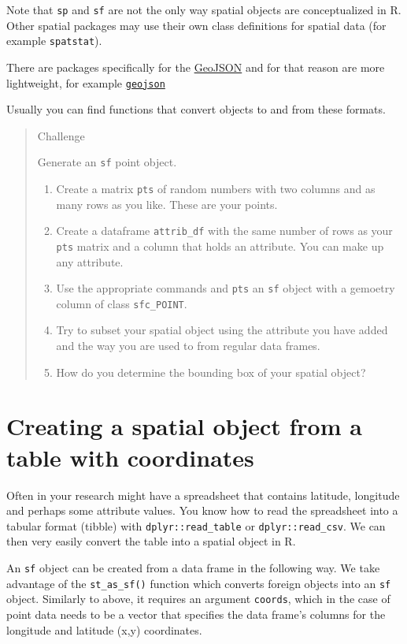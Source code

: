 \documentclass[
]{book}
\providecommand{\tightlist}{%
  \setlength{\itemsep}{0pt}\setlength{\parskip}{0pt}}
\begin{document}
Note that \texttt{sp} and \texttt{sf} are not the only way spatial objects are conceptualized in R. Other spatial packages may use their own class definitions for spatial data (for example \texttt{spatstat}).

There are packages specifically for the \href{https://tools.ietf.org/html/rfc7946}{GeoJSON} and for that reason are more lightweight, for example \href{https://cran.r-project.org/package=geojson}{\texttt{geojson}}

Usually you can find functions that convert objects to and from these formats.

\begin{quote}
Challenge

Generate an \texttt{sf} point object.

\begin{enumerate}
\def\labelenumi{\arabic{enumi}.}
\tightlist
\item
  Create a matrix \texttt{pts} of random numbers with two columns and as many rows as you like. These are your points.
\item
  Create a dataframe \texttt{attrib\_df} with the same number of rows as your \texttt{pts} matrix and a column that holds an attribute. You can make up any attribute.
\item
  Use the appropriate commands and \texttt{pts} an \texttt{sf} object with a gemoetry column of class \texttt{sfc\_POINT}.
\item
  Try to subset your spatial object using the attribute you have added and the way you are used to from regular data frames.
\item
  How do you determine the bounding box of your spatial object?
\end{enumerate}
\end{quote}

\section{Creating a spatial object from a table with coordinates}\label{creating-a-spatial-object-from-a-table-with-coordinates}

Often in your research might have a spreadsheet that contains latitude, longitude and perhaps some attribute values. You know how to read the spreadsheet into a tabular format (tibble) with \texttt{dplyr::read\_table} or \texttt{dplyr::read\_csv}. We can then very easily convert the table into a spatial object in R.

An \texttt{sf} object can be created from a data frame in the following way. We take advantage of the \texttt{st\_as\_sf()} function which converts foreign objects into an \texttt{sf} object. Similarly to above, it requires an argument \texttt{coords}, which in the case of point data needs to be a vector that specifies the data frame's columns for the longitude and latitude (x,y) coordinates.
\end{document}
